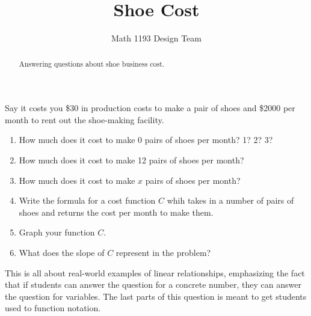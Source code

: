 \documentclass[noauthor]{ximera}
\title{Shoe Cost}
\author{Math 1193 Design Team}
\begin{document}
\begin{abstract}
    Answering questions about shoe business cost.
\end{abstract}
\maketitle

Say it costs you \$30 in production costs to make a pair
of shoes and \$2000 per month to rent out the shoe-making
facility.

\begin{enumerate}
    \item How much does it cost to 
    make 0 pairs of shoes per month? 1? 2? 3? 
    \item How much does it cost to 
    make 12 pairs of shoes per month?
    \item How much does it cost to 
    make \(x\) pairs of shoes per month? 
    \item Write the formula for a cost function \(C\)
    whih takes in a number of pairs of shoes and
    returns the cost per month to make them.
    \item Graph your function \(C\).
    \item What does the slope of \(C\) represent
    in the problem?
\end{enumerate}

\begin{instructorNotes}
This is all about real-world examples of linear relationships,
emphasizing the fact that if students can answer the question 
for a concrete number, they can answer the question for 
variables. The last parts of this question is meant to 
get students used to function notation. 
\end{instructorNotes}
\end{document}
